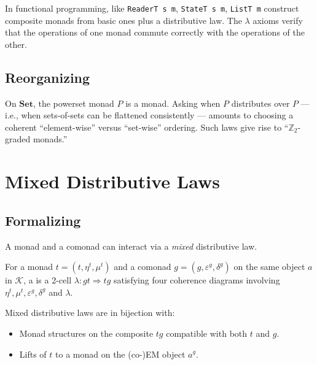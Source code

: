 \begin{example_thm}
In functional programming,  like
\texttt{ReaderT s m}, \texttt{StateT s m}, \texttt{ListT m} construct
composite monads from basic ones plus a distributive law. The
$\lambda$ axioms verify that the operations of one monad commute
correctly with the operations of the other.
\end{example_thm}

\subsection{Reorganizing}

\begin{example_thm}
On $\mathbf{Set}$, the powerset monad $P$ is a monad. Asking when $P$
distributes over $P$ — i.e., when sets-of-sets can be flattened consistently
— amounts to choosing a coherent ``element-wise'' versus ``set-wise''
ordering. Such laws give rise to ``$\mathbb{Z}_2$-graded monads.''
\end{example_thm}


\section{Mixed Distributive Laws}
\label{sec:mixed-dist}

\subsection{Formalizing}

A monad and a comonad can interact via a \emph{mixed} distributive law.

\begin{definition}
\label{def:mixed-dist}
For a monad $t = (t, \eta^t, \mu^t)$ and a comonad $g = (g, \varepsilon^g,
\delta^g)$ on the same object $a$ in $\mathcal{K}$, a  is a 2-cell $\lambda : gt \Rightarrow tg$ satisfying four coherence
diagrams involving $\eta^t, \mu^t, \varepsilon^g, \delta^g$ and $\lambda$.
\end{definition}

\begin{theorem}
\label{thm:mixed-beck}
Mixed distributive laws are in bijection with:
\begin{itemize}
  \item Monad structures on the composite $tg$ compatible with both $t$ and $g$.
  \item Lifts of $t$ to a monad on the (co-)EM object $a^g$.
\end{itemize}
\end{theorem}


